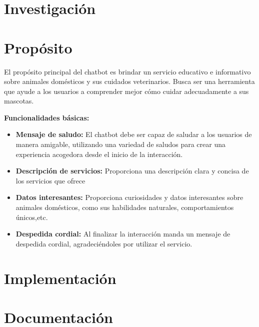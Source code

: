 \documentclass[a4paper,12pt]{article}
\begin{document}


\newpage

\section*{Investigación}

\section*{Propósito}
El propósito principal del chatbot es brindar un servicio educativo e informativo sobre animales domésticos y sus cuidados veterinarios. Busca ser una herramienta que ayude a los usuarios a comprender mejor cómo cuidar adecuadamente a sus mascotas.

\textbf{Funcionalidades básicas:}
\begin{itemize}
    \item \textbf{Mensaje de saludo:} El chatbot debe ser capaz de saludar a los usuarios de manera amigable, utilizando una variedad de saludos para crear una experiencia acogedora desde el inicio de la interacción.
    
    \item \textbf{Descripción de servicios:} Proporciona una descripción clara y concisa de los servicios que ofrece 

    \item \textbf{Datos interesantes:} Proporciona curiosidades y datos interesantes sobre animales domésticos, como sus habilidades naturales, comportamientos únicos,etc.

    \item \textbf{Despedida cordial:} Al finalizar la interacción manda un mensaje de despedida cordial, agradeciéndoles por utilizar el servicio.
\end{itemize}\section*{Implementación}

\section*{Documentación}

\newpage %
\thispagestyle{fancyref}
\printbibliography %
\end{document}

